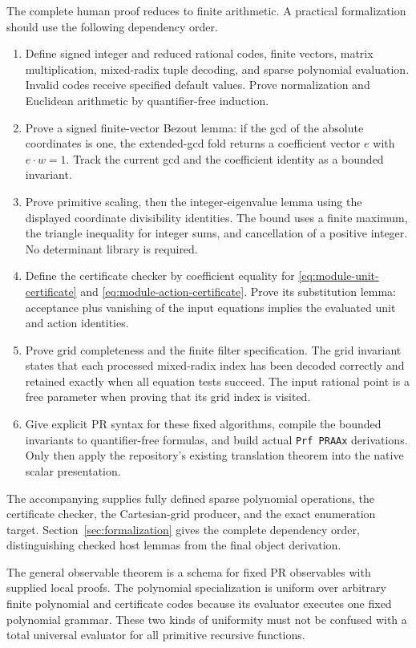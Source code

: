 The complete human proof reduces to finite arithmetic.  A practical
formalization should use the following dependency order.
\begin{enumerate}
\item Define signed integer and reduced rational codes, finite vectors,
matrix multiplication, mixed-radix tuple decoding, and sparse polynomial
evaluation.  Invalid codes receive specified default values.  Prove
normalization and Euclidean arithmetic by quantifier-free induction.
\item Prove a signed finite-vector Bezout lemma: if the gcd of the
absolute coordinates is one, the extended-gcd fold returns a coefficient
vector $e$ with $e\cdot w=1$.  Track the current gcd and the coefficient
identity as a bounded invariant.
\item Prove primitive scaling, then the integer-eigenvalue lemma using
the displayed coordinate divisibility identities.  The bound uses a
finite maximum, the triangle inequality for integer sums, and cancellation
of a positive integer.  No determinant library is required.
\item Define the certificate checker by coefficient equality for
\eqref{eq:module-unit-certificate} and
\eqref{eq:module-action-certificate}.  Prove its substitution lemma:
acceptance plus vanishing of the input equations implies the evaluated
unit and action identities.
\item Prove grid completeness and the finite filter specification.
The grid invariant states that each processed mixed-radix index has
been decoded correctly and retained exactly when all equation tests
succeed.  The input rational point is a free parameter when proving
that its grid index is visited.
\item Give explicit PR syntax for these fixed algorithms, compile the
bounded invariants to quantifier-free formulas, and build actual
\texttt{Prf PRAAx} derivations.  Only then apply the repository's
existing translation theorem into the native scalar presentation.
\end{enumerate}

The accompanying  supplies
fully defined sparse polynomial operations, the certificate checker,
the Cartesian-grid producer, and the exact enumeration target.
Section~\ref{sec:formalization} gives the complete dependency order,
distinguishing checked host lemmas from the final object derivation.

The general observable theorem is a schema for fixed PR observables
with supplied local proofs.  The polynomial specialization is uniform
over arbitrary finite polynomial and certificate codes because its
evaluator executes one fixed polynomial grammar.  These two kinds of
uniformity must not be confused with a total universal evaluator for
all primitive recursive functions.
